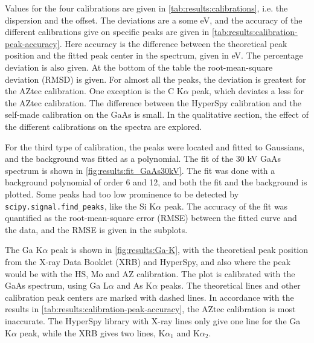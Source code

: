 Values for the four calibrations are given in \cref{tab:results:calibrations}, i.e. the dispersion and the offset.
The deviations are a some eV, and the accuracy of the different calibrations give on specific peaks are given in \cref{tab:results:calibration-peak-accuracy}.
Here accuracy is the difference between the theoretical peak position and the fitted peak center in the spectrum, given in eV.
The percentage deviation is also given.
At the bottom of the table the root-mean-square deviation (RMSD) is given.
For almost all the peaks, the deviation is greatest for the AZtec calibration.
One exception is the C K$\alpha$ peak, which deviates a less for the AZtec calibration. %
The difference between the HyperSpy calibration and the self-made calibration on the GaAs is small.
In the qualitative section, the effect of the different calibrations on the spectra are explored.






For the third type of calibration, the peaks were located and fitted to Gaussians, and the background was fitted as a polynomial.
The fit of the 30 kV GaAs spectrum is shown in \cref{fig:results:fit_GaAs30kV}.
The fit was done with a background polynomial of order 6 and 12, and both the fit and the background is plotted.
Some peaks had too low prominence to be detected by \verb|scipy.signal.find_peaks|, like the Si K$\alpha$ peak.
The accuracy of the fit was quantified as the root-mean-square error (RMSE) between the fitted curve and the data, and the RMSE is given in the subplots.


The Ga K$\alpha$ peak is shown in \cref{fig:results:Ga-K}, with the theoretical peak position from the X-ray Data Booklet \cite{thompson_x-ray_2004} (XRB) and HyperSpy, and also where the peak would be with the HS, Mo and AZ calibration.
The plot is calibrated with the GaAs spectrum, using Ga L$\alpha$ and As K$\alpha$ peaks.
The theoretical lines and other calibration peak centers are marked with dashed lines.
In accordance with the results in \cref{tab:results:calibration-peak-accuracy}, the AZtec calibration is most inaccurate.
The HyperSpy library with X-ray lines only give one line for the Ga K$\alpha$ peak, while the XRB gives two lines, K$\alpha_1$ and K$\alpha_2$.

